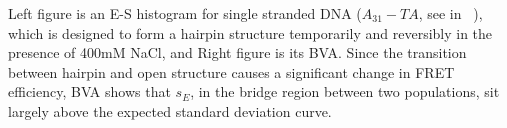 Left figure is an E-S histogram for single stranded DNA ($A_{31}-TA$, see in ~\cite{Tsukanov_2013}), which is designed to form a hairpin structure temporarily and reversibly in the presence of 400mM NaCl, and Right figure is its BVA. Since the transition between hairpin and open structure causes a significant change in FRET efficiency, BVA shows that $s_E$, in the bridge region between two populations, sit largely above the expected standard deviation curve.